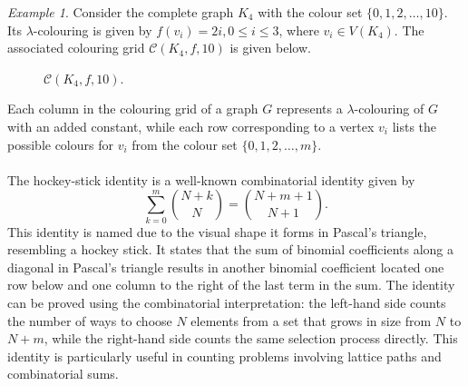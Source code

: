 \documentclass{birkjour}
\theoremstyle{definition}
\theoremstyle{remark}
\newtheorem*{example}{Example}
\numberwithin{equation}{section}
\begin{document}
\begin{example}
Consider the complete graph \( K_4 \) with the colour set \( \{0, 1, 2, \dots, 10\} \). Its \( \lambda \)-colouring is given by  \( f(v_i)=2i, 0 \leq i \leq 3 \), where \( v_i \in V(K_4) \). The associated colouring grid \( \mathcal{C}(K_4, f, 10) \) is given below.\\

\begin{figure}[h]
\centering
{}
\vskip 0.2cm
\caption{ \( \mathcal{C}(K_4, f, 10) \).}
\label{fig:coloring-matrix}
\end{figure}
\end{example}
\vspace{-0.5cm}
\noindent
 Each column in the colouring grid of a graph $G$ represents a  $\lambda$-colouring of $G$ with an added constant, while each row corresponding to a vertex $v_i$ lists the possible colours for $v_i$ from the colour set $\{0, 1, 2, \dots, m\}$.\\
 \\
\noindent
The hockey-stick identity is a well-known combinatorial identity given by
\[
\sum_{k=0}^{m} \binom{N+k}{N} = \binom{N+m+1}{N+1}.
\]
This identity is named due to the visual shape it forms in Pascal’s triangle, resembling a hockey stick. It states that the sum of binomial coefficients along a diagonal in Pascal’s triangle results in another binomial coefficient located one row below and one column to the right of the last term in the sum. The identity can be proved using the combinatorial interpretation: the left-hand side counts the number of ways to choose $N$ elements from a set that grows in size from $N$ to $N+m$, while the right-hand side counts the same selection process directly. This identity is particularly useful in counting problems involving lattice paths and combinatorial sums.
\end{document}
